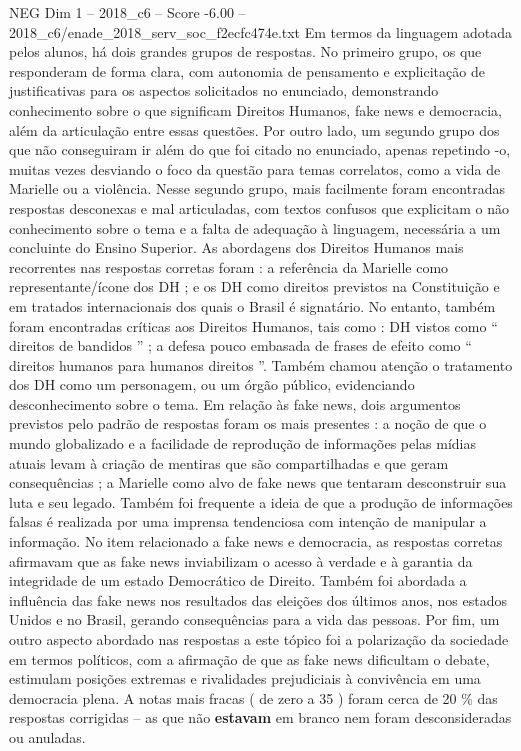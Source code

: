 \begin{textsample}{NEG Dim 1 – 2018\_c6 – Score -6.00 – 2018\_c6/enade\_2018\_serv\_soc\_f2ecfc474e.txt}
Em termos da linguagem adotada pelos alunos, há dois grandes grupos de respostas.
No primeiro grupo, os que responderam de forma clara, com autonomia de pensamento e explicitação de justificativas para os aspectos solicitados no enunciado, demonstrando conhecimento sobre o que significam Direitos Humanos, fake news e democracia, além da articulação entre essas questões.
Por outro lado, um segundo grupo dos que não conseguiram ir além do que foi citado no enunciado, apenas repetindo -o, muitas vezes desviando o foco da questão para temas correlatos, como a vida de Marielle ou a violência.
Nesse segundo grupo, mais facilmente foram encontradas respostas desconexas e mal articuladas, com textos confusos que explicitam o não conhecimento sobre o tema e a falta de adequação à linguagem, necessária a um concluinte do Ensino Superior.
As abordagens dos Direitos Humanos mais recorrentes nas respostas corretas foram : a referência da Marielle como representante/ícone dos DH ; e os DH como direitos previstos na Constituição e em tratados internacionais dos quais o Brasil é signatário.
No entanto, também foram encontradas críticas aos Direitos Humanos, tais como : DH vistos como “ direitos de bandidos ” ; a defesa pouco embasada de frases de efeito como “ direitos humanos para humanos direitos ”.
Também chamou atenção o tratamento dos DH como um personagem, ou um órgão público, evidenciando desconhecimento sobre o tema.
Em relação às fake news, dois argumentos previstos pelo padrão de respostas foram os mais presentes : a noção de que o mundo globalizado e a facilidade de reprodução de informações pelas mídias atuais levam à criação de mentiras que são compartilhadas e que geram consequências ; a Marielle como alvo de fake news que tentaram desconstruir sua luta e seu legado.
Também foi frequente a ideia de que a produção de informações falsas é realizada por uma imprensa tendenciosa com intenção de manipular a informação.
No item relacionado a fake news e democracia, as respostas corretas afirmavam que as fake news inviabilizam o acesso à verdade e à garantia da integridade de um estado Democrático de Direito.
Também foi abordada a influência das fake news nos resultados das eleições dos últimos anos, nos estados Unidos e no Brasil, gerando consequências para a vida das pessoas.
Por fim, um outro aspecto abordado nas respostas a este tópico foi a polarização da sociedade em termos políticos, com a afirmação de que as fake news dificultam o debate, estimulam posições extremas e rivalidades prejudiciais à convivência em uma democracia plena.
A notas mais fracas ( de zero a 35 ) foram cerca de 20 \% das respostas corrigidas – as que não \textbf{estavam} em branco nem foram desconsideradas ou anuladas.

\end{textsample}
